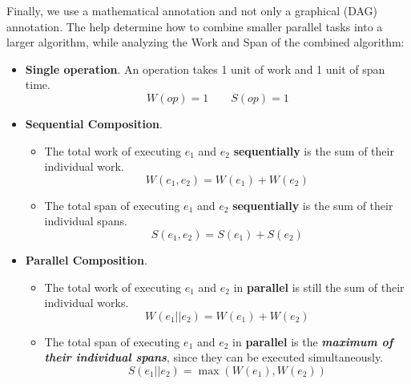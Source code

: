 \noindent
Finally, we use a mathematical annotation and not only a graphical (DAG) annotation. The  help determine how to combine smaller parallel tasks into a larger algorithm, while analyzing the Work and Span of the combined algorithm:
\begin{itemize}
    \item \textbf{Single operation}. An operation takes 1 unit of work and 1 unit of span time.
    \begin{equation*}
        W\left(op\right) = 1 \hspace{2em} S\left(op\right) = 1
    \end{equation*}

    \newpage

    \item \textbf{Sequential Composition}.
    \begin{itemize}
        \item The total work of executing $e_{1}$ and $e_{2}$ \textbf{sequentially} is the sum of their individual work.
        \begin{equation*}
            W\left(e_{1}, e_{2}\right) = W\left(e_{1}\right) + W\left(e_{2}\right)
        \end{equation*}

        \item The total span of executing $e_{1}$ and $e_{2}$ \textbf{sequentially} is the sum of their individual spans.
        \begin{equation*}
            S\left(e_{1}, e_{2}\right) = S\left(e_{1}\right) + S\left(e_{2}\right)
        \end{equation*}
    \end{itemize}
    
    \item \textbf{Parallel Composition}.
    \begin{itemize}
        \item The total work of executing $e_{1}$ and $e_{2}$ in \textbf{parallel} is still the sum of their individual works.
        \begin{equation*}
            W\left(e_{1} || e_{2}\right) = W\left(e_{1}\right) + W\left(e_{2}\right)
        \end{equation*}

        \item The total span of executing $e_{1}$ and $e_{2}$ in \textbf{parallel} is the \emph{\textbf{maximum of their individual spans}}, since they can be executed simultaneously.
        \begin{equation*}
            S\left(e_{1} || e_{2}\right) = \max\left(W\left(e_{1}\right), W\left(e_{2}\right)\right)
        \end{equation*}
    \end{itemize}
\end{itemize}